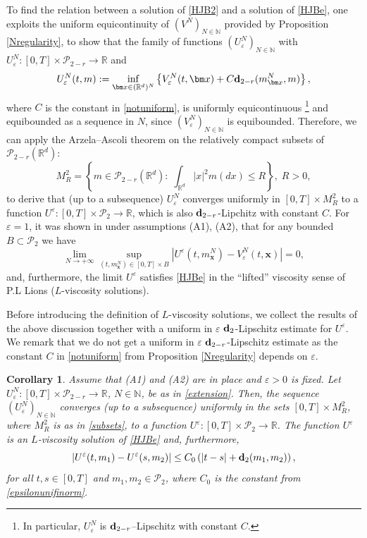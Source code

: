 \documentclass[reqno,11pt]{amsart}
\newtheorem{corollary}[theorem]{Corollary}
\numberwithin{equation}{section}
\newcommand{\be}{\begin{equation}}
\newcommand{\ee}{\end{equation}}
\newcommand{\R}{\mathbb{R}} %
\newcommand{\e}{\varepsilon}
\newcommand{\nd}{\noindent}
\begin{document}
\nd
To find the relation between a solution of \eqref{HJB2} and a solution of \eqref{HJBe}, one exploits the uniform equicontinuity of $(V^{N})_{N\in\mathbb{N}}$ provided by Proposition \ref{Nregularity}, to show that the family of functions $(U^N_\e)_{N\in\mathbb{N}}$ with $U^N_\e\colon [0,T]\times \mathcal{P}_{2-r}\to \R$ and
\be\label{extension}
U^N_\e(t,m):= \inf_{\bm x\in (\R^d)^N}\left\{ V^N_\e(t,\bm x)+C{\bf d}_{2-r}(m^N_{\bm x},m)   \right\},
\ee
where $C$ is the constant in \eqref{notuniform}, is uniformly equicontinuous \footnote{In particular, $U^N_\e$ is ${\bf d}_{2-r}$--Lipschitz with constant $C$.} and equibounded as a sequence in $N$, since $(V_\e^N)_{N\in\mathbb{N}}$ is equibounded. Therefore, we can apply the Arzela--Ascoli theorem on the relatively compact subsets of $\mathcal{P}_{2-r}(\R^d)$:
\be\label{subsets}
M_R^2=\left\{m\in \mathcal{P}_{2-r}(\R^d):\; \int_{\R^d}|x|^2 m(dx)\le R \right\},\; R>0,
\ee
to derive that (up to a subsequence) $U^N_\e$ converges uniformly in $[0,T]\times M_R^2$ to a function $U^\e\colon [0,T]\times \mathcal{P}_2\to \R$, which is also ${\bf d}_{2-r}$-Lipchitz with constant $C$.
For $\e=1$, it was shown
in \cite[Theorem 1.2]{gangbo2021finite} under assumptions (A1), (A2), that for any bounded $B\subset \mathcal{P}_2$ we have
$$\lim_{N\rightarrow +\infty}\sup_{(t,m_{\bm x}^N)\in [0,T]\times B}|U^\e(t,m_{\bm x}^N)-V^N_\e(t,\bm x)|=0,$$
and, furthermore, the limit $U^\e$ satisfies \eqref{HJBe} in the ``lifted'' viscosity sense of P.L Lions ($L$-viscosity solutions).
\vspace{1mm}

\nd
Before introducing the definition of $L$-viscosity solutions, we collect the results of the above discussion together with a uniform in $\e$ ${\bf d}_2$-Lipschitz estimate for $U^\e$. We remark that we do not get a uniform in $\e$ ${\bf d}_{2-r}$-Lipschitz estimate as the constant $C$ in \eqref{notuniform} from Proposition \ref{Nregularity} depends on $\e$.

\begin{corollary}\label{cor:lipschitzestimate}
    Assume that (A1) and (A2) are in place and $\e>0$ is fixed. Let $U^N_\e\colon [0,T]\times\mathcal{P}_{2-r}\to \R$, $N\in \mathbb{N}$, be as in \eqref{extension}. Then, the sequence $(U^N_\e)_{N\in \mathbb{N}}$ converges (up to a subsequence) uniformly in the sets $[0,T]\times M_R^2$, where $M_R^2$ is as in \eqref{subsets}, to a function $U^\e\colon[0,T]\times\mathcal{P}_2\to \R$. The function $U^\e$ is an $L$-viscosity solution of \eqref{HJBe} and, furthermore,
    \be\label{uniforminepsilon}
|U^\e(t,m_1)-U^\e(s,m_2)|\le C_0\left( |t-s|+{\bf d}_2(m_1,m_2) \right),
    \ee
    for all $t,s\in [0,T]$ and $m_1,m_2\in\mathcal{P}_2$, where $C_0$ is the constant from \eqref{epsilonunifinorm}.
\end{corollary}
\end{document}
